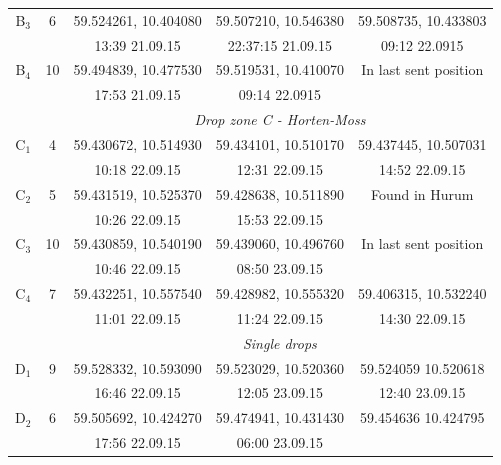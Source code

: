 \documentclass[12pt,a4paper,english]{article}
\begin{document}
\begin{table}[tb]
\begin{tabular}{|c|c|ccc|}
        B$_3$& 6       & 59.524261, 10.404080 & 59.507210, 10.546380    & 59.508735, 10.433803       \\
             &         & 13:39 21.09.15       & 22:37:15 21.09.15       & 09:12 22.0915              \\
        B$_4$& 10      & 59.494839, 10.477530 & 59.519531, 10.410070    & In last sent position      \\
             &         & 17:53 21.09.15       & 09:14 22.0915           &                            \\ \hline 
             &         &          \multicolumn{3}{c|}{\textit{Drop zone C - Horten-Moss}}             \\
        C$_1$& 4       & 59.430672, 10.514930 & 59.434101, 10.510170    & 59.437445, 10.507031       \\
             &         & 10:18 22.09.15       & 12:31 22.09.15          & 14:52 22.09.15             \\
        C$_2$& 5       & 59.431519, 10.525370 & 59.428638, 10.511890    & Found in Hurum             \\
             &         & 10:26 22.09.15       & 15:53 22.09.15          &                            \\
        C$_3$& 10      & 59.430859, 10.540190 & 59.439060, 10.496760    & In last sent position      \\
             &         & 10:46 22.09.15	      & 08:50 23.09.15          &                            \\
        C$_4$& 7       & 59.432251, 10.557540 & 59.428982, 10.555320    & 59.406315, 10.532240       \\
             &         & 11:01 22.09.15       & 11:24 22.09.15          & 14:30 22.09.15             \\ \hline 
             &         &          \multicolumn{3}{c|}{\textit{Single drops}}                          \\
        D$_1$& 9       & 59.528332, 10.593090 & 59.523029, 10.520360    & 59.524059 10.520618        \\
             &         & 16:46 22.09.15       & 12:05 23.09.15          & 12:40 23.09.15             \\
        D$_2$& 6       & 59.505692, 10.424270 & 59.474941, 10.431430    & 59.454636 10.424795        \\
             &         & 17:56 22.09.15       & 06:00 23.09.15          &                            \\ 
\hline 
\end{tabular}
\end{table}
\clearpage
\end{document}
